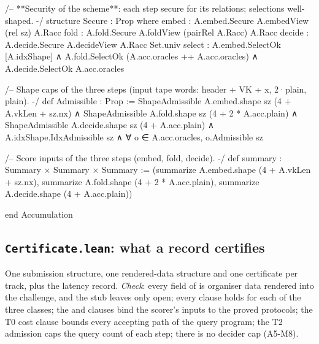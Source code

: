 \begin{leancode}[fontsize=\scriptsize,label={\footnotesize Contract/Accumulation.lean}]
/-- **Security of the scheme**: each step secure for its relations; selections well-shaped. -/
structure Secure : Prop where
  embed : A.embed.Secure A.embedView (rel sz) A.Racc
  fold : A.fold.Secure A.foldView (pairRel A.Racc) A.Racc
  decide : A.decide.Secure A.decideView A.Racc Set.univ
  select : A.embed.SelectOk [A.idxShape] ∧ A.fold.SelectOk (A.acc.oracles ++ A.acc.oracles) ∧
    A.decide.SelectOk A.acc.oracles

/-- Shape caps of the three steps (input tape words: header + VK + x, 2·plain, plain). -/
def Admissible : Prop :=
  ShapeAdmissible A.embed.shape sz (4 + A.vkLen + sz.nx) ∧
    ShapeAdmissible A.fold.shape sz (4 + 2 * A.acc.plain) ∧
    ShapeAdmissible A.decide.shape sz (4 + A.acc.plain) ∧ A.idxShape.IdxAdmissible sz ∧
    ∀ o ∈ A.acc.oracles, o.Admissible sz

/-- Score inputs of the three steps (embed, fold, decide). -/
def summary : Summary × Summary × Summary :=
  (summarize A.embed.shape (4 + A.vkLen + sz.nx), summarize A.fold.shape (4 + 2 * A.acc.plain),
    summarize A.decide.shape (4 + A.acc.plain))

end Accumulation
\end{leancode}

\subsection{\texttt{Certificate.lean}: what a record certifies}

One submission structure, one rendered-data structure and one certificate per track, plus the
latency record. \emph{Check}: every field of  is organiser data rendered into
the challenge, and the stub leaves only  open; every clause holds for each of the
three classes; the  and  clauses bind the scorer's inputs to the proved
protocols; the T0 cost clause bounds every accepting path of the query program; the T2 admission
caps the query count of each step; there is no decider cap (A5-M8).

